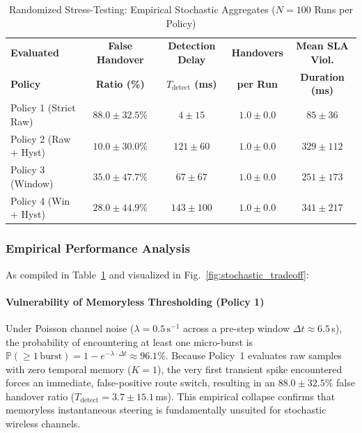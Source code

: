 \begin{table}[htbp]
\caption{Randomized Stress-Testing: Empirical Stochastic Aggregates ($N = 100$ Runs per Policy)}
\label{tab:random_comparison}
\centering
\begin{tabular}{lcccc}
\toprule
\textbf{Evaluated} & \textbf{False Handover} & \textbf{Detection Delay} & \textbf{Handovers} & \textbf{Mean SLA Viol.} \\
\textbf{Policy} & \textbf{Ratio (\%)} & \textbf{$T_{\text{detect}}$ (ms)} & \textbf{per Run} & \textbf{Duration (ms)} \\
\midrule
Policy 1 (Strict Raw)    & $88.0 \pm 32.5\%$          & $4 \pm 15$           & $1.0 \pm 0.0$          & $85 \pm 36$ \\
Policy 2 (Raw + Hyst)    & \textbf{$10.0 \pm 30.0\%$} & $121 \pm 60$         & \textbf{$1.0 \pm 0.0$} & \textbf{$329 \pm 112$} \\
Policy 3 (Window)        & $35.0 \pm 47.7\%$          & $67 \pm 67$          & $1.0 \pm 0.0$          & $251 \pm 173$ \\
Policy 4 (Win + Hyst)    & \textbf{$28.0 \pm 44.9\%$} & $143 \pm 100$        & $1.0 \pm 0.0$          & $341 \pm 217$ \\
\bottomrule
\end{tabular}
\end{table}

\subsubsection{Empirical Performance Analysis}
As compiled in Table~\ref{tab:random_comparison} and visualized in Fig.~\ref{fig:stochastic_tradeoff}:

\paragraph{Vulnerability of Memoryless Thresholding (Policy 1)}
Under Poisson channel noise ($\lambda = 0.5\,\text{s}^{-1}$ across a pre-step window $\Delta t \approx 6.5$\,s), the probability of encountering at least one micro-burst is $\mathbb{P}(\ge 1\,\text{burst}) = 1 - e^{-\lambda \cdot \Delta t} \approx 96.1\%$. Because Policy~1 evaluates raw samples with zero temporal memory ($K=1$), the very first transient spike encountered forces an immediate, false-positive route switch, resulting in an $88.0 \pm 32.5\%$ false handover ratio ($T_{\text{detect}} = 3.7 \pm 15.1$\,ms). This empirical collapse confirms that memoryless instantaneous steering is fundamentally unsuited for stochastic wireless channels.


